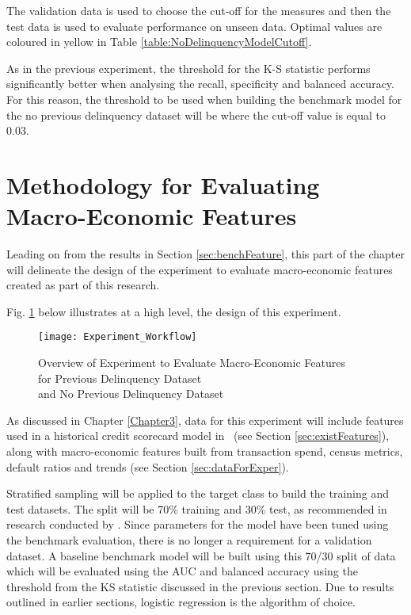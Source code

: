 The validation data is used to choose the cut-off for the measures and then the test data is used to evaluate performance on unseen data. Optimal values are coloured in yellow in Table \ref{table:NoDelinquencyModelCutoff}.

As in the previous experiment, the threshold for the K-S statistic performs significantly better when analysing the recall, specificity and balanced accuracy. For this reason, the threshold to be used when building the benchmark model for the no previous delinquency dataset will be where the cut-off value is equal to 0.03.

\section{Methodology for Evaluating Macro-Economic Features}
Leading on from the results in Section \ref{sec:benchFeature}, this part of the chapter will delineate the design of the experiment to evaluate macro-economic features created as part of this research. 
 
Fig. \ref{fig:Experiment_Workflow} below illustrates at a high level, the design of this experiment. 

\begin{figure}[H]
	\texttt{[image: Experiment\_Workflow]}
	\caption{Overview of Experiment to Evaluate Macro-Economic Features \\
		for Previous Delinquency Dataset \\
		and No Previous Delinquency Dataset}
	\label{fig:Experiment_Workflow}
\end{figure}

As discussed in Chapter \ref{Chapter3}, data for this experiment will include features used in a historical credit scorecard model in \subjectname\ (see Section \ref{sec:existFeatures}), along with macro-economic features built from transaction spend, census metrics, default ratios and trends (see Section \ref{sec:dataForExper}). 

Stratified sampling will be applied to the target class to build the training and test datasets. The split will be 70\% training and 30\% test, as recommended in research conducted by \cite{siddiqi_credit_2012}. Since parameters for the model have been tuned using the benchmark evaluation, there is no longer a requirement for a validation dataset. A baseline benchmark model will be built using this 70/30 split of data which will be evaluated using the AUC and balanced accuracy using the threshold from the KS statistic discussed in the previous section. Due to results outlined in earlier sections, logistic regression is the algorithm of choice.

